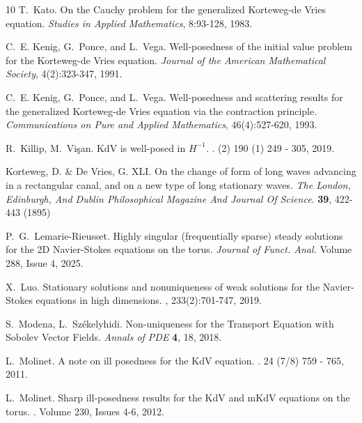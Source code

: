 \documentclass[12pt,reqno,letterpaper]{amsart}
\numberwithin{equation}{section}
\newcommand{\1}{{\bf 1}}
\newcommand{\2}{{\bf 2}}
\theoremstyle{remark}
\theoremstyle{remark}
\begin{document}
\begin{thebibliography}{10}
    T.~Kato.
    \newblock On the Cauchy problem for the generalized Korteweg-de Vries equation.
    \newblock \emph{Studies in Applied Mathematics}, 8:93-128, 1983.

    C.~E. Kenig, G.~Ponce, and L.~Vega.
    \newblock Well-posedness of the initial value problem for the Korteweg-de Vries equation.
    \newblock \emph{Journal of the American Mathematical Society}, 4(2):323-347, 1991.

    C.~E. Kenig, G.~Ponce, and L.~Vega.
    \newblock Well-posedness and scattering results for the generalized
    Korteweg-de Vries equation via the contraction principle.
    \newblock \emph{Communications on Pure and Applied Mathematics},
    46(4):527-620, 1993.

    R.~Killip, M.~Vi\c{s}an.
    \newblock KdV is well-posed in $H^{-1}$.
    . (2) 190 (1) 249 - 305, 2019.

    Korteweg, D. \& De Vries, G. XLI. On the change of form of long waves advancing in a rectangular canal, and on a new type of long stationary waves. 
    {\em The London, Edinburgh, And Dublin Philosophical Magazine And Journal Of Science}. \textbf{39}, 422-443 (1895)

    P.~G.~Lemarie-Rieusset.
    \newblock Highly singular (frequentially sparse) steady solutions for the 2D Navier-Stokes equations on the torus.
    \newblock\emph{Journal of Funct. Anal.} Volume 288, Issue 4, 2025.

    X.~Luo.
    \newblock Stationary solutions and nonuniqueness of weak solutions for the Navier-Stokes equations in high dimensions.
    , 233(2):701-747, 2019.

    S.~Modena, L.~Sz{{\'e}}kelyhidi.
    \newblock Non-uniqueness for the Transport Equation with Sobolev Vector Fields.
    \newblock \emph{Annals of PDE} \textbf{4}, 18, 2018.

    L.~Molinet.
    \newblock A note on ill posedness for the KdV equation.
    . 24 (7/8) 759 - 765, 2011. 

    L.~Molinet.
    \newblock Sharp ill-posedness results for the KdV and mKdV equations on the torus.
    . Volume 230, Issues 4-6, 2012.


\end{thebibliography}
\end{document}
